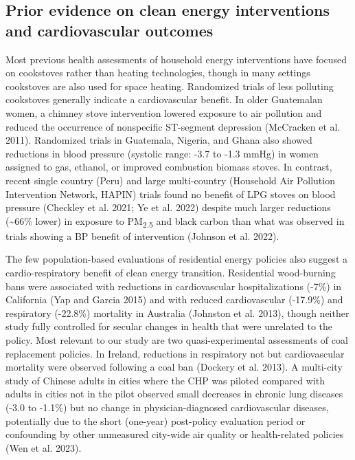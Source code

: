 \documentclass[
  letterpaper,
  DIV=11,
  numbers=noendperiod]{scrartcl}
\begin{document}
\subsection{Prior evidence on clean energy interventions and
cardiovascular
outcomes}\label{prior-evidence-on-clean-energy-interventions-and-cardiovascular-outcomes}

Most previous health assessments of household energy interventions have
focused on cookstoves rather than heating technologies, though in many
settings cookstoves are also used for space heating. Randomized trials
of less polluting cookstoves generally indicate a cardiovascular
benefit. In older Guatemalan women, a chimney stove intervention lowered
exposure to air pollution and reduced the occurrence of nonspecific
ST-segment depression (McCracken et al. 2011). Randomized trials in
Guatemala, Nigeria, and Ghana also showed reductions in blood pressure
(systolic range: -3.7 to -1.3 mmHg) in women assigned to gas, ethanol,
or improved combustion biomass stoves. In contrast, recent single
country (Peru) and large multi-country (Household Air Pollution
Intervention Network, HAPIN) trials found no benefit of LPG stoves on
blood pressure (Checkley et al. 2021; Ye et al. 2022) despite much
larger reductions (\textasciitilde66\% lower) in exposure to
PM\textsubscript{2.5} and black carbon than what was observed in trials
showing a BP benefit of intervention (Johnson et al. 2022).

The few population-based evaluations of residential energy policies also
suggest a cardio-respiratory benefit of clean energy transition.
Residential wood-burning bans were associated with reductions in
cardiovascular hospitalizations (-7\%) in California (Yap and Garcia
2015) and with reduced cardiovascular (-17.9\%) and respiratory
(-22.8\%) mortality in Australia (Johnston et al. 2013), though neither
study fully controlled for secular changes in health that were unrelated
to the policy. Most relevant to our study are two quasi-experimental
assessments of coal replacement policies. In Ireland, reductions in
respiratory not but cardiovascular mortality were observed following a
coal ban (Dockery et al. 2013). A multi-city study of Chinese adults in
cities where the CHP was piloted compared with adults in cities not in
the pilot observed small decreases in chronic lung diseases (-3.0 to
-1.1\%) but no change in physician-diagnosed cardiovascular diseases,
potentially due to the short (one-year) post-policy evaluation period or
confounding by other unmeasured city-wide air quality or health-related
policies (Wen et al. 2023).
\end{document}
